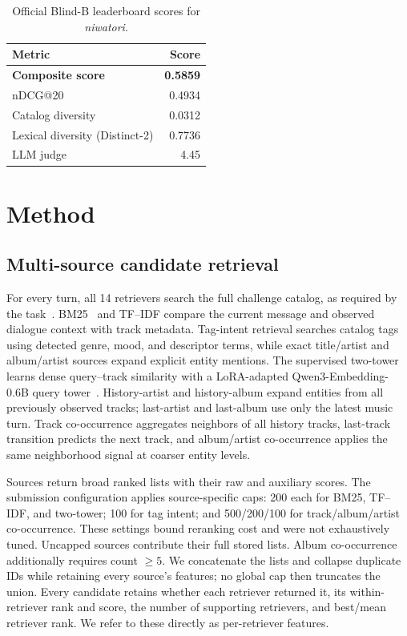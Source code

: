 \documentclass[sigconf]{acmart}
\begin{document}
\begin{table}[t]
  \caption{Official Blind-B leaderboard scores for \textit{niwatori}.}
  \label{tab:blind}
  \centering
  \small
  \begin{tabular}{lr}
    \toprule
    Metric & Score \\
    \midrule
    \textbf{Composite score} & \textbf{0.5859} \\
    \midrule
    nDCG@20 & 0.4934 \\
    Catalog diversity & 0.0312 \\
    Lexical diversity (Distinct-2) & 0.7736 \\
    LLM judge & 4.45 \\
    \bottomrule
  \end{tabular}
\end{table}

\section{Method}
\subsection{Multi-source candidate retrieval}
For every turn, all 14 retrievers search the full challenge catalog, as required
by the task~\cite{challenge2026}.  BM25~\cite{robertson2009bm25} and TF--IDF compare the current message
and observed dialogue context with track metadata.  Tag-intent retrieval
searches catalog tags using detected genre, mood, and descriptor terms, while
exact title/artist and album/artist sources expand explicit entity mentions.
The supervised two-tower learns dense query--track similarity with a
LoRA-adapted Qwen3-Embedding-0.6B query tower~\cite{hu2022lora,qwen3embedding}.
History-artist and history-album expand entities from all previously observed
tracks; last-artist and last-album use only the latest music turn.  Track
co-occurrence aggregates neighbors of all history tracks, last-track
transition predicts the next track, and album/artist co-occurrence applies the
same neighborhood signal at coarser entity levels.

Sources return broad ranked lists with their raw and auxiliary scores.  The
submission configuration applies source-specific caps: 200 each for BM25,
TF--IDF, and two-tower; 100 for tag intent; and 500/200/100 for
track/album/artist co-occurrence.  These settings bound reranking cost and were
not exhaustively tuned.  Uncapped sources contribute their full stored lists.
Album co-occurrence additionally requires count $\geq 5$.  We concatenate the
lists and collapse duplicate IDs while retaining every source's features; no
global cap then truncates the union.
Every candidate retains whether each retriever returned it, its within-retriever
rank and score, the number of supporting retrievers, and best/mean retriever
rank.  We refer to these directly as per-retriever features.
\end{document}
